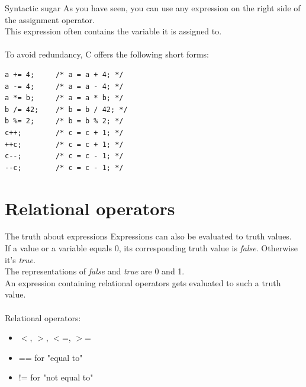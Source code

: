 \begin{frame}[fragile]{Syntactic sugar}
	As you have seen, you can use any expression on the right side of the assignment operator.\\
	This expression often contains the variable it is assigned to.\\\ \\
	To avoid redundancy, C offers the following short forms:\\
	\begin{lstlisting}[numbers=none]
a += 4;     /* a = a + 4; */
a -= 4;     /* a = a - 4; */
a *= b;     /* a = a * b; */
b /= 42;    /* b = b / 42; */
b %= 2;     /* b = b % 2; */
c++;        /* c = c + 1; */
++c;        /* c = c + 1; */
c--;        /* c = c - 1; */
--c;        /* c = c - 1; */
\end{lstlisting}
\end{frame}

\section{Relational operators}

\begin{frame}{The truth about expressions}
	Expressions can also be evaluated to truth values.\\
	If a value or a variable equals 0, its corresponding truth value is \textit{false}. Otherwise it's \textit{true}.\\
	The representations of \textit{false} and \textit{true} are 0 and 1.\\
	An expression containing relational operators gets evaluated to such a truth value.\\
	\ \\Relational operators:
	\begin{itemize}
		\item $<$, $>$, $<$=, $>$=
		\item == for "equal to"
		\item != for "not equal to"
	\end{itemize}
\end{frame}

